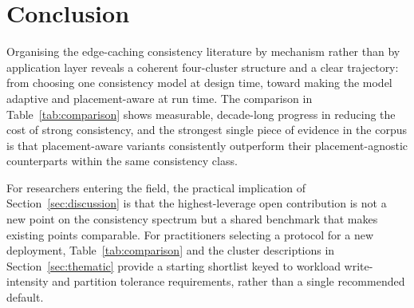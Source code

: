 \section{Conclusion}
\label{sec:conclusion}

Organising the edge-caching consistency literature by mechanism rather than by application layer
reveals a coherent four-cluster structure and a clear trajectory: from choosing one consistency model
at design time, toward making the model adaptive and placement-aware at run time. The comparison in
Table~\ref{tab:comparison} shows measurable, decade-long progress in reducing the cost of strong
consistency, and the strongest single piece of evidence in the corpus is that placement-aware variants
consistently outperform their placement-agnostic counterparts within the same consistency class.

For researchers entering the field, the practical implication of Section~\ref{sec:discussion} is that
the highest-leverage open contribution is not a new point on the consistency spectrum but a shared
benchmark that makes existing points comparable. For practitioners selecting a protocol for a new
deployment, Table~\ref{tab:comparison} and the cluster descriptions in Section~\ref{sec:thematic}
provide a starting shortlist keyed to workload write-intensity and partition tolerance requirements,
rather than a single recommended default.
